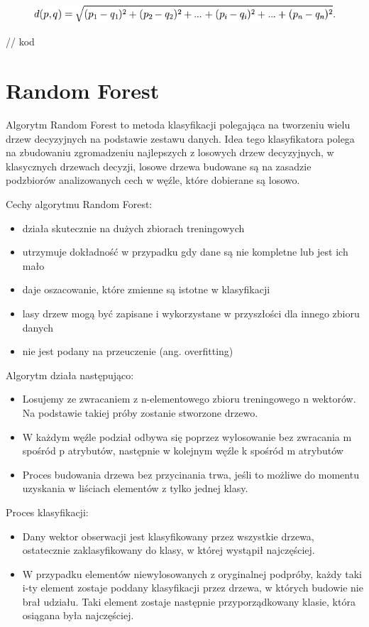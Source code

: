 \documentclass[brudnopis]{xmgr}
\begin{document}
\begin{figure}[!tbh]
\centering
\includegraphics[width=.8\hsize]{fig/knn-wzor}
\end{figure}

// kod

\section{Random Forest}

Algorytm Random Forest to metoda klasyfikacji polegająca na tworzeniu wielu drzew decyzyjnych na podstawie zestawu danych. Idea tego klasyfikatora polega na zbudowaniu zgromadzeniu najlepszych z losowych drzew decyzyjnych, w klasycznych drzewach decyzji, losowe drzewa budowane są na zasadzie podzbiorów analizowanych cech w węźle, które dobierane są losowo.

Cechy algorytmu Random Forest:
\begin{itemize}
\item
działa skutecznie na dużych zbiorach treningowych
\item
utrzymuje dokładność w przypadku gdy dane są nie kompletne lub jest ich mało
\item
daje oszacowanie, które zmienne są istotne w klasyfikacji
\item
lasy drzew mogą być zapisane i wykorzystane w przyszłości dla innego zbioru danych
\item
nie jest podany na przeuczenie (ang. overfitting)
\end{itemize}

Algorytm działa następująco:
\begin{itemize}
\item
Losujemy ze zwracaniem z n-elementowego zbioru treningowego n wektorów. Na podstawie takiej próby zostanie stworzone drzewo.
\item
W każdym węźle podział odbywa się poprzez wylosowanie bez zwracania m spośród p atrybutów, następnie w kolejnym węźle k spośród m atrybutów
\item
Proces budowania drzewa bez przycinania trwa, jeśli to możliwe do momentu uzyskania w liściach elementów z tylko jednej klasy.
\end{itemize}

Proces klasyfikacji:
\begin{itemize}
\item
Dany wektor obserwacji jest klasyfikowany przez wszystkie drzewa, ostatecznie zaklasyfikowany do klasy, w której wystąpił najczęściej.
\item
W przypadku elementów niewylosowanych z oryginalnej podpróby, każdy taki i-ty element zostaje poddany klasyfikacji przez drzewa, w których budowie nie brał udziału. Taki element zostaje następnie przyporządkowany klasie, która osiągana była najczęściej.
\end{itemize}
\end{document}
